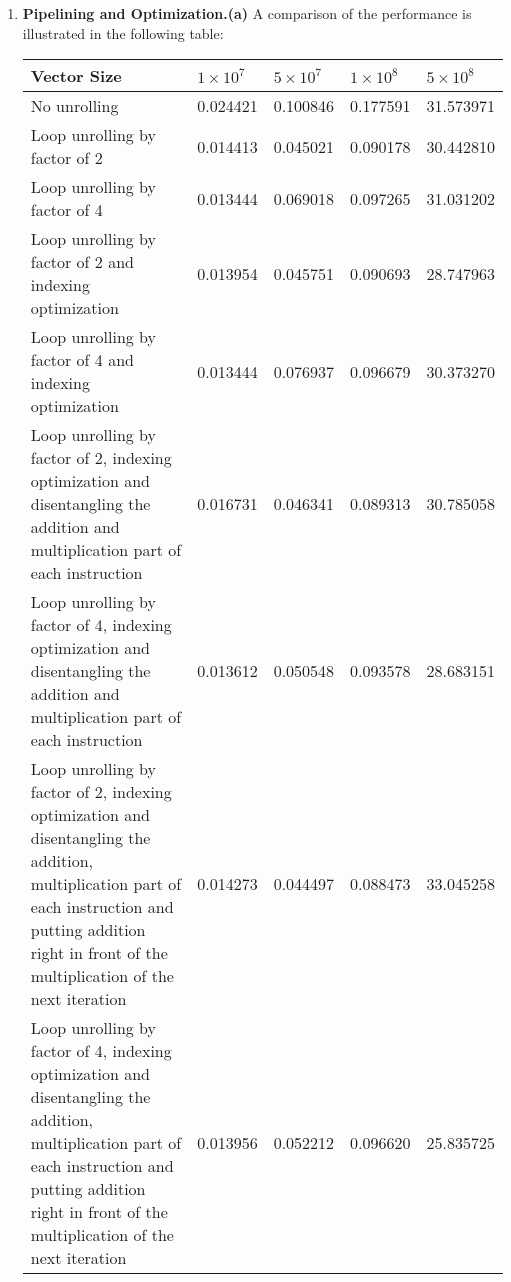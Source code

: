 \documentclass{article}
\begin{document}
\begin{enumerate}
    \item \textbf{Pipelining and Optimization.(a)} A comparison of the performance is illustrated in the following table:
\begin{center}
\begin{tabular}{||m{5cm} m{1.5cm} m{1.5 cm} m{1.5 cm} m{1.5 cm} ||} 
 \hline
 Vector Size & $1\times 10^7$ & $5\times 10^7$ & $1\times 10^8$ & $5\times 10^8$ \\ [0.5ex] 
 \hline\hline
No unrolling & 0.024421 & 0.100846 & 0.177591 & 31.573971 \\ [1ex] 
 \hline
Loop unrolling by factor of 2 & 0.014413 & 0.045021 & 0.090178 & 30.442810  \\ [1ex]
\hline
Loop unrolling by factor of 4 & 0.013444 & 0.069018 & 0.097265 & 31.031202 \\ [1ex]
\hline
Loop unrolling by factor of 2 and indexing optimization &0.013954 & 0.045751 & 0.090693 & 28.747963  \\ [1ex]
\hline
Loop unrolling by factor of 4 and indexing optimization &0.013444  & 0.076937 &  0.096679 & 30.373270 \\ [1ex]
\hline
Loop unrolling by factor of 2, indexing optimization and disentangling the addition and multiplication part of each instruction & 0.016731 & 0.046341 & 0.089313 & 30.785058\\ [1ex]
\hline
Loop unrolling by factor of 4, indexing optimization and disentangling the addition and multiplication part of each instruction & 0.013612 & 0.050548 & 0.093578 & 28.683151 \\ [1ex]
\hline
Loop unrolling by factor of 2, indexing optimization and disentangling the addition, multiplication part of each instruction and putting addition right in front of the multiplication of the next iteration &  0.014273 & 0.044497 & 0.088473 & 33.045258 \\ [1ex]
\hline
Loop unrolling by factor of 4, indexing optimization and disentangling the addition, multiplication part of each instruction and putting addition right in front of the multiplication of the next iteration &  0.013956 &  0.052212 & 0.096620 & 25.835725 \\ [1ex]
\hline
\end{tabular}
\end{center}

\end{enumerate}
\end{document}

